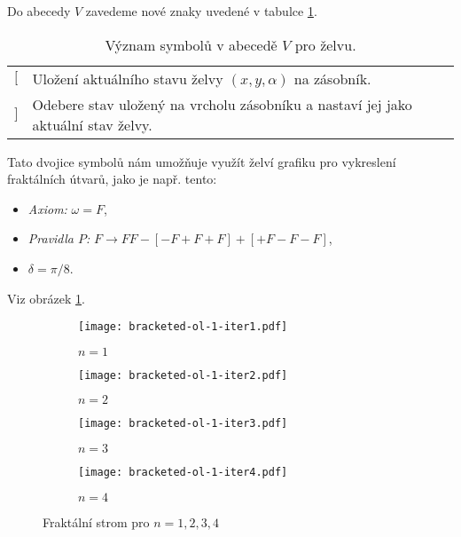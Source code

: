 Do abecedy $V$ zavedeme nové znaky uvedené v tabulce \ref{table:vyznam-symbolu-zelva-zasobnik}. 
\begin{table}[H]
    \centering
    \begin{tabular}{lp{}}
        $[$ & Uložení aktuálního stavu želvy $(x,y,\alpha)$ na zásobník.\\
        $]$ & Odebere stav uložený na vrcholu zásobníku a nastaví jej jako aktuální stav želvy.
    \end{tabular}
    \caption{Význam symbolů v abecedě $V$ pro želvu.}
    \label{table:vyznam-symbolu-zelva-zasobnik}
\end{table}
Tato dvojice symbolů nám umožňuje využít želví grafiku pro vykreslení fraktálních útvarů, jako je např. tento:
\begin{itemize}
    \item \emph{Axiom:} $\omega=F$,
    \item \emph{Pravidla $P$:} $F\to FF-[-F+F+F]+[+F-F-F]$,
    \item $\delta=\pi/8$.
\end{itemize}
Viz obrázek \ref{fig:fraktalni-strom}.
\begin{figure}[H]
    \centering
    \begin{subfigure}{0.3\textwidth}
        \centering
        \texttt{[image: bracketed-ol-1-iter1.pdf]}
        \begin{center}
            $n=1$
        \end{center}
    \end{subfigure}
    \begin{subfigure}{0.3\textwidth}
        \centering
        \texttt{[image: bracketed-ol-1-iter2.pdf]}
        \begin{center}
            $n=2$
        \end{center}
    \end{subfigure}
    \begin{subfigure}{0.3\textwidth}
        \centering
        \texttt{[image: bracketed-ol-1-iter3.pdf]}
        \begin{center}
            $n=3$
        \end{center}
    \end{subfigure}
    \begin{subfigure}{0.4\textwidth}
        \centering
        \texttt{[image: bracketed-ol-1-iter4.pdf]}
        \begin{center}
            $n=4$
        \end{center}
    \end{subfigure}
    \caption{Fraktální strom pro $n=1,2,3,4$}
    \label{fig:fraktalni-strom}
\end{figure}

